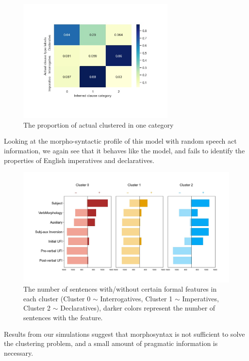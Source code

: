 \begin{figure}[H]
    \centering
    \includegraphics[width=0.7\textwidth]{figures/noisy100-heatrev.jpg}
    \caption{The proportion of actual \diis{} clustered in one category}
    \label{fig:noisy100-heatrev}
\end{figure}

Looking at the morpho-syntactic profile of this model with random speech act information, we again see that it behaves like the \dlearnerabbr{} model, and fails to identify the properties of English imperatives and declaratives.

\begin{figure}[H]
    \centering
    \includegraphics[width=1\textwidth]{figures/noisy100-syncluster.jpg}
    \caption{The number of sentences with/without certain formal features in each cluster (Cluster 0 $\sim$ Interrogatives, Cluster 1 $\sim$ Imperatives, Cluster 2 $\sim$ Declaratives), darker colors represent the number of sentences with the feature.}
    \label{fig:noisy100-syncluster}
\end{figure}

Results from our simulations suggest that morphosyntax is not sufficient to solve the clustering problem, and a small amount of pragmatic information is necessary.

